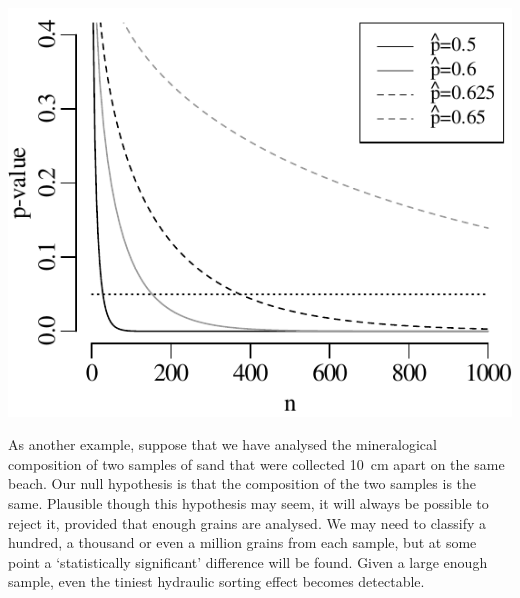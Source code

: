 \noindent\begin{minipage}[t][][b]{.45\textwidth}
  \includegraphics[]{../figures/binompvsn.pdf}
\end{minipage}
\begin{minipage}[t][][t]{.55\textwidth}
  \label{fig:binomnvsp}
\end{minipage}

As another example, suppose that we have analysed the mineralogical
composition of two samples of sand that were collected 10~cm apart on
the same beach. Our null hypothesis is that the composition of the two
samples is the same. Plausible though this hypothesis may seem, it
will always be possible to reject it, provided that enough grains are
analysed. We may need to classify a hundred, a thousand or even a
million grains from each sample, but at some point a `statistically
significant' difference will be found. Given a large enough sample,
even the tiniest hydraulic sorting effect becomes detectable.\medskip

